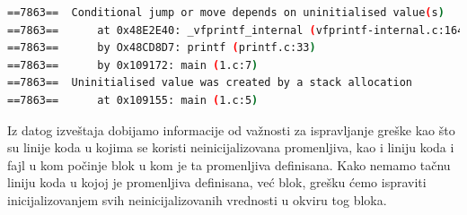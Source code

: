 \documentclass[12pt,oneside]{memoir}
\theoremstyle{plain}
\theoremstyle{definition}
\begin{document}

\begin{lstlisting}[style=terminal,caption={Ispis greške korišćenja statičke neinicijalizovane promenljive}, label={lst:slika4.5},language={bash}]   
==7863==  Conditional jump or move depends on uninitialised value(s)
==7863==      at 0x48E2E40: _vfprintf_internal (vfprintf-internal.c:1644) 
==7863==      by Ox48CD8D7: printf (printf.c:33)
==7863==      by 0x109172: main (1.c:7)
==7863==  Uninitialised value was created by a stack allocation
==7863==      at 0x109155: main (1.c:5)
\end{lstlisting}

Iz datog izveštaja dobijamo informacije od važnosti za ispravljanje greške kao što su linije koda u kojima se koristi neinicijalizovana promenljiva, kao i liniju koda i fajl u kom počinje blok u kom je ta promenljiva definisana. Kako nemamo tačnu liniju koda u kojoj je promenljiva definisana, već blok, grešku ćemo ispraviti inicijalizovanjem svih neinicijalizovanih vrednosti u okviru tog bloka. 
\end{document}
